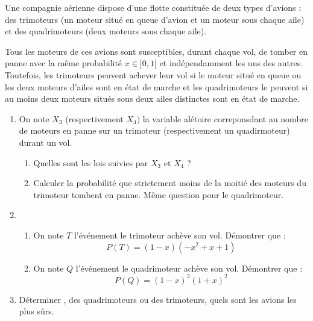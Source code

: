 



\begin{exercice}[D'après G2E 2014]
Une compagnie aérienne dispose d’une flotte constituée de deux types d’avions : des trimoteurs (un moteur situé en queue d’avion et un moteur sous chaque aile) et des quadrimoteurs (deux moteurs sous chaque aile).

Tous les moteurs de ces avions sont susceptibles, durant chaque vol, de tomber en panne avec la même probabilité $x\in ]0,1[$ et indépendamment les uns des autres. Toutefois, les trimoteurs peuvent achever leur vol si le moteur situé en queue ou les deux moteurs d’ailes sont en  état de marche et les quadrimoteurs le peuvent si au moins deux moteurs situés sous deux ailes distinctes sont en  état de marche.

\begin{enumerate}
\item On note $X_3 $ (respectivement $X_4)$ la variable alétoire correponsdant au nombre de moteurs en panne sur un trimoteur (respectivement un quadirmoteur) durant un vol.
\begin{enumerate}
\item Quelles sont les lois suivies par $X_3$ et  $X_4$ ? 
\item Calculer la probabilité que strictement moins de la moitié des moteurs du trimoteur tombent en panne. Même question pour le quadrimoteur. 
\end{enumerate}
\item 
\begin{enumerate}
\item On note $T$ l'événement \og le trimoteur achève son vol\fg. Démontrer que : 
$$P(T) =(1-x)(-x^2+x+1)$$
\item On note $Q$ l'événement \og le quadrimoteur achève son vol\fg. Démontrer que : 
$$P(Q) =(1-x)^2(1+x)^2$$

\end{enumerate}
\item Déterminer , des quadrimoteurs ou des trimoteurs, quels sont les avions les plus sûrs. 
\end{enumerate}
\end{exercice}

